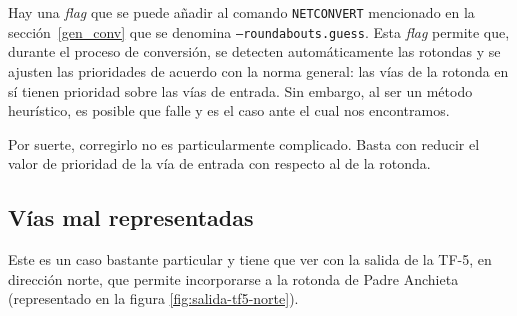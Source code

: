 Hay una \textit{flag} que se puede añadir al comando \texttt{NETCONVERT} mencionado en la sección~\ref{gen_conv} que se denomina \texttt{--roundabouts.guess}. Esta \textit{flag} permite que, durante el proceso de conversión, se detecten automáticamente las rotondas y se ajusten las prioridades de acuerdo con la norma general: las vías de la rotonda en sí tienen prioridad sobre las vías de entrada. Sin embargo, al ser un método heurístico, es posible que falle y es el caso ante el cual nos encontramos.

Por suerte, corregirlo no es particularmente complicado. Basta con reducir el valor de prioridad de la vía de entrada con respecto al de la rotonda.

\subsection{Vías mal representadas}

Este es un caso bastante particular y tiene que ver con la salida de la TF-5, en dirección norte, que permite incorporarse a la rotonda de Padre Anchieta (representado en la figura \ref{fig:salida-tf5-norte}). 


